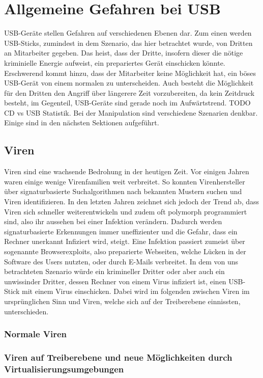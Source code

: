 \documentclass[a4paper,11pt,DIV=11,BROC=5mm,bigheadings,idxtotoc,cleardoubleempty,halfparskip,oneside,openright]{scrreprt} %
\begin{document}
			\chapter{Allgemeine Gefahren bei USB}\label{AllgGefBeiUSB}
USB-Geräte stellen Gefahren auf verschiedenen Ebenen dar. Zum einen werden USB-Sticks, zumindest in dem Szenario, das hier betrachtet wurde, von Dritten an Mitarbeiter gegeben. Das heist, dass der Dritte, insofern dieser die nötige kriminielle Energie aufweist, ein prepariertes Gerät einschicken könnte. Erschwerend kommt hinzu, dass der Mitarbeiter keine Möglichkeit hat, ein böses USB-Gerät von einem normalen zu unterscheiden. Auch besteht die Möglichkeit für den Dritten den Angriff über längerere Zeit vorzubereiten, da kein Zeitdruck besteht, im Gegenteil, USB-Geräte sind gerade noch im Aufwärtstrend. TODO CD vs USB Statistik. Bei der Manipulation sind verschiedene Szenarien denkbar. Einige sind in den nächsten Sektionen aufgeführt.

			\section{Viren}
Viren sind eine wachsende Bedrohung in der heutigen Zeit. Vor einigen Jahren waren einige wenige Virenfamilien weit verbreitet. So konnten Virenhersteller über signaturbasierte Suchalgorithmen nach bekannten Mustern suchen und Viren identifizieren. In den letzten Jahren zeichnet sich jedoch der Trend ab, dass Viren sich schneller weiterentwickeln und zudem oft polymorph programmiert sind, also ihr aussehen bei einer Infektion verändern. Dadurch werden signaturbasierte Erkennungen immer uneffizienter und die Gefahr, dass ein Rechner unerkannt Infiziert wird, steigt. Eine Infektion passiert zumeist über sogenannte Browserexploits, also preparierte Webseiten, welche Lücken in der Software des Users nutzten, oder durch E-Mails verbreitet. In dem von uns betrachteten Szenario würde ein krimineller Dritter oder aber auch ein unwissinder Dritter, dessen Rechner von einem Virus infiziert ist, einen USB-Stick mit einem Virus einschicken. Dabei wird im folgenden zwischen Viren im ursprünglichen Sinn und Viren, welche sich auf der Treiberebene einnissten, unterschieden.

			\subsection{Normale Viren}
			\subsection{Viren auf Treiberebene und neue Möglichkeiten durch Virtualisierungsumgebungen}
\end{document}

